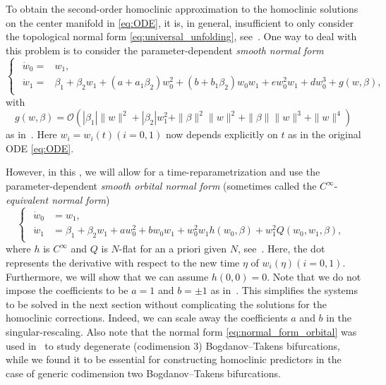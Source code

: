 To obtain the second-order homoclinic approximation to the homoclinic solutions
on the center manifold in \cref{eq:ODE}, it is, in general, insufficient to
only consider the topological normal form \cref{eq:universal_unfolding},
see~\cite{Broer1991}.  One way to deal with this problem is to consider the parameter-dependent {\it smooth normal form} 
\begin{equation}
\label{eq:BT_smooth_nf}
\begin{cases}
\begin{aligned}
\dot{w}_0 = & w_1,\\
\dot{w}_1 = & \beta_1+\beta_2 w_1+\left(a+a_1\beta_2\right)w_0^{2}
 +\left(b+b_1\beta_2\right) w_0w_1+ew_0^{2}w_1+dw_0^{3} + g(w,\beta),
\end{aligned}
\end{cases}
\end{equation}
with
\[
    g(w,\beta) = \mathcal O(|\beta_1|\|w\|^2 + |\beta_2| w_1^2 + \|\beta\|^2\|w\|^2
					 + \|\beta\|\|w\|^3 + \|w\|^4)
\] 
as in~\cite{Gray-Scott2015,Al-Hdaibat2016}. Here $w_i=w_i(t)(i=0,1)$ now
depends explicitly on $t$ as in the original ODE \cref{eq:ODE}.

However, in this \paper{}, we will allow for a time-reparametrization and use the parameter-dependent {\it smooth orbital normal form} (sometimes called the $C^\infty$-{\it equivalent normal form}) 
\begin{equation}
\label{eq:normal_form_orbital}
\begin{cases}
\begin{aligned}
	\dot w_0 &= w_1, \\
	\dot w_1 &= \beta_1 + \beta_2 w_1 + aw_0^2 + b w_0 w_1 + w_0^2 w_1
								h(w_0,\beta) + w_1^2 Q(w_0,w_1,\beta),
\end{aligned}
\end{cases}
\end{equation}
where $h$ is $C^\infty$ and $Q$ is $N$-flat for an a priori given $N$,
see~\cite{Broer1991}. Here, the dot represents the derivative with respect to
the new time $\eta$ of $w_i(\eta)(i=0,1)$.  Furthermore, we will show that we
can assume $h(0,0)=0$. Note that we do not impose the coefficients to be $a=1$
and $b=\pm 1$ as in~\cite{Broer1991}. This simplifies the systems to be solved
in the next section without complicating the solutions for the homoclinic
corrections. Indeed, we can scale away the coefficients $a$ and $b$ in the
singular-rescaling. Also note that the normal form
\cref{eq:normal_form_orbital} was used in~\cite{Broer1991} to study degenerate
(codimension 3) Bogdanov--Takens bifurcations, while we found it to be essential
for constructing homoclinic predictors in the case of generic codimension two
Bogdanov--Takens bifurcations.


